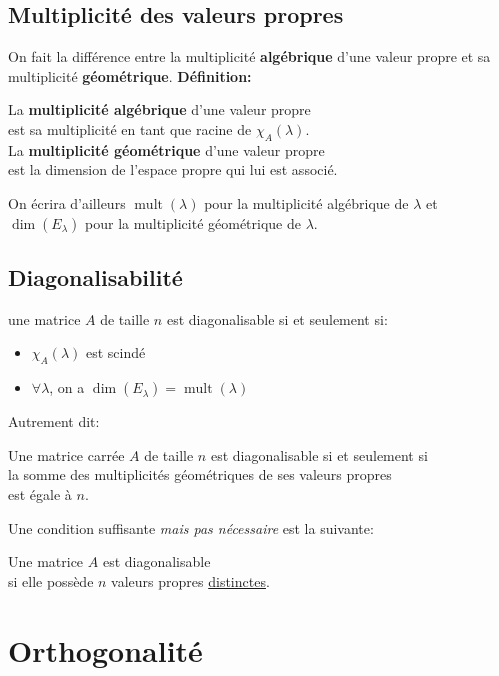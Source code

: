 \documentclass{article}
\numberwithin{equation}{section}
\newcommand\thm[1]{\vspace{4px}\noindent \quad {\large \underline{\textsc{Théorème #1}}: }}
\DeclareMathOperator{\mult}{mult}
\begin{document}
\subsection{Multiplicité des valeurs propres}
On fait la différence entre la multiplicité \textbf{algébrique} d'une valeur propre et sa multiplicité \textbf{géométrique}.
\textbf{Définition:}
\begin{center}
	La \textbf{multiplicité algébrique} d'une valeur propre \\ est sa multiplicité en tant que racine de \(\chi_A(\lambda)\). \\ \vspace{10pt}
	La \textbf{multiplicité géométrique} d'une valeur propre \\ est la dimension de l'espace propre qui lui est associé.
\end{center}
On écrira d'ailleurs \(\mult(\lambda)\) pour la multiplicité algébrique de \(\lambda\) et \(\dim(E_\lambda)\) pour la multiplicité géométrique de \(\lambda\).

\subsection{Diagonalisabilité}
\thm{} une matrice $A$ de taille $n$ est diagonalisable si et seulement si:
\begin{itemize}
	\item \(\chi_A(\lambda)\) est scindé
	\item \(\forall \lambda\), on a \(\dim(E_\lambda) = \mult(\lambda)\)
\end{itemize}
Autrement dit:
\begin{center}
	Une matrice carrée $A$ de taille $n$ est diagonalisable si et seulement si \\ la somme des multiplicités géométriques de ses valeurs propres \\ est égale à $n$.
\end{center}
Une condition suffisante \emph{mais pas nécessaire} est la suivante:
\begin{center}
	Une matrice $A$ est diagonalisable \\ si elle possède $n$ valeurs propres \underline{distinctes}.
\end{center}


\section{Orthogonalité}
\end{document}
